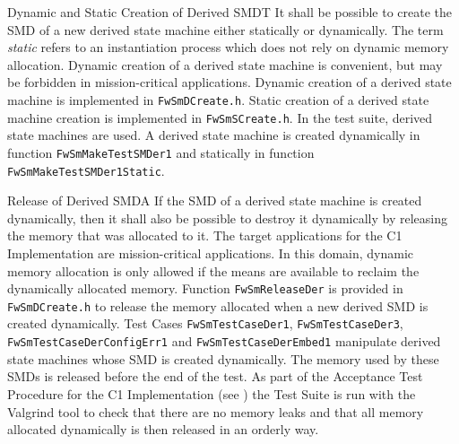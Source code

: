 \documentclass[requirements]{../fwprofile}
\begin{document}
\begin{fw_req_note}{Dynamic and Static Creation of Derived SMD}{T}
{It shall be possible to create the SMD of a new derived state 
machine either statically or dynamically.}
{The term \emph{static} refers to an instantiation process which 
does not rely on dynamic memory allocation.}
{Dynamic creation of a derived state machine is convenient, 
but may be forbidden in mission-critical applications.}
{Dynamic creation of a derived state machine is implemented in
\texttt{FwSmDCreate.h}. 
Static creation of a derived state machine creation is implemented in \texttt{FwSmSCreate.h}.} 
{In the test suite, derived state machines are used. 
A derived state machine is created dynamically in function \texttt{FwSmMakeTestSMDer1} 
and statically in function \texttt{FwSmMakeTestSMDer1Static}.}
\end{fw_req_note}

\newpage
\begin{fw_req}{Release of Derived SMD}{A}
{If the SMD of a derived state machine is created dynamically, 
then it shall also be possible to destroy it dynamically by releasing the memory that 
was allocated to it.}
{The target applications for the C1 Implementation are 
mission-critical applications. 
In this domain, dynamic memory allocation is only allowed if the means are available 
to reclaim the dynamically allocated memory.}
{Function \texttt{FwSmReleaseDer} is provided in 
\texttt{FwSmDCreate.h} to release the memory allocated when a new derived SMD is 
created dynamically.} 
{Test Cases \texttt{FwSmTestCaseDer1}, \texttt{FwSmTestCaseDer3}, 
\texttt{FwSmTestCaseDerConfigErr1} and 
\texttt{FwSmTestCaseDerEmbed1} manipulate derived state machines whose SMD is created dynamically.
The memory used by these SMDs is released before the end of the test. 
As part of the Acceptance Test Procedure for the C1 Implementation (see \cite{ref:um})
the Test Suite is run with the Valgrind tool to check that there are no memory 
leaks and that all memory allocated dynamically is then released in an orderly way.}
\end{fw_req}
\end{document}
